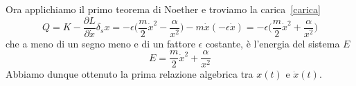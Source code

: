 \begin{example}
        Ora applichiamo il primo teorema di Noether e troviamo la carica~\eqref{carica} 
    \begin{equation*}
        Q = K - \frac{\partial L}{\partial \dot x} \delta_s x = - \epsilon \Big (\frac{m}{2} \dot x^2 - \frac{\alpha}{x^2} \Big) - m \dot x (-\epsilon \dot x) = - \epsilon (\frac{m}{2} \dot x^2 + \frac{\alpha}{x^2} \Big)
    \end{equation*}
        che a meno di un segno meno e di un fattore $\epsilon$ costante, è l'energia del sistema $E$
    \begin{equation}\label{energia1}
        E = \frac{m}{2} \dot x^2 + \frac{\alpha}{x^2}
    \end{equation}
        Abbiamo dunque ottenuto la prima relazione algebrica tra $x(t)$ e $\dot x(t)$. 

        \hfill


\end{example}
